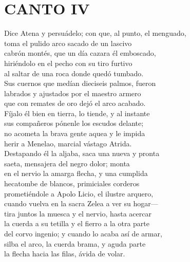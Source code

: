 \bnum
\section*{\centering\textbf{CANTO IV}}
%
\separator
%
\postart
{}
Dice Atena y persuádelo; con que, al punto, el menguado,\\
toma el pulido arco sacado de un lascivo\\
cabrón montés, que un día cazara él emboscado,\\
hiriéndolo en el pecho con su tiro furtivo\\
al saltar de una roca donde quedó tumbado.\\
Sus cuernos que medían dieciseis palmos, fueron\\
labrados y ajustados por el maestro armero\\
que con remates de oro dejó el arco acabado.\\
Fíjalo él bien en tierra, lo tiende, y al instante\\
sus compañeros pónenle los escudos delante;\\
no acometa la brava gente aquea y le impida\\
herir a Menelao, marcial vástago Atrida.\\
Destapando él la aljaba, saca una nueva y pronta\\
saeta, mensajera del negro dolor; monta\\
en el nervio la amarga flecha, y una cumplida\\
hecatombe de blancos, primiciales corderos\\
prometiéndole a Apolo Licio, el ilustre arquero,\\
cuando vuelva en la sacra Zelea a ver su hogar---\\
tira juntos la muesca y el nervio, hasta acercar\\
la cuerda a su tetilla y el fierro a la otra parte\\
del corvo ingenio; y cuando lo acaba así de armar,\\
silba el arco, la cuerda brama, y aguda parte\\
la flecha hacia las filas, ávida de volar.\par
\poend
\enum
%
\separator